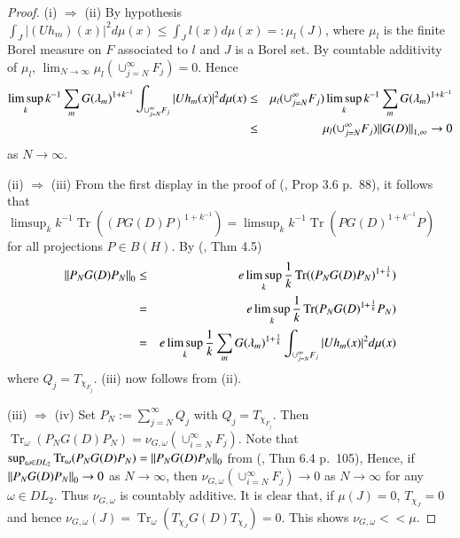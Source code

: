 \documentclass[final,1p]{elsarticle}
\numberwithin{equation}{section}
\theoremstyle{plain}
\theoremstyle{definition}
\begin{document}
\begin{proof}
(i) $\Rightarrow$ (ii) By hypothesis $\int_{J} |(Uh_m)(x)|^2 d\mu(x)
\leq \int_{J} l(x) d\mu(x) =: \mu_l(J)$, where $\mu_l$ is the finite Borel measure on $F$ associated to $l$ and $J$ is a Borel set.  By countable additivity of $\mu_l$,
$\lim_{N \to \infty} \mu_l(\cup_{j=N}^\infty F_j)
= 0$.  Hence
\begin{eqnarray*}
\limsup_k k^{-1} \sum_{m} G(\lambda_m)^{1+ k^{-1}} \int_{ \cup_{j=N}^\infty F_j} |Uh_m(x)|^2 d\mu(x)
& \leq & \mu_l(\cup_{j=N}^\infty F_j) \limsup_k k^{-1} \sum_{m} G(\lambda_m)^{1+ k^{-1}} \\
& \leq & \mu_l(\cup_{j=N}^\infty F_j) {\mbox{\ensuremath{\| {G(D)} \|}}}_{1,\infty} \to 0
\end{eqnarray*}
as $N \to \infty$.

(ii) $\Rightarrow$ (iii) From the first display in the proof of (\cite{CPS}, Prop 3.6 p.~88), it follows that $\limsup_k k^{-1}\operatorname{Tr}((PG(D)P)^{1+k^{-1}})
= \limsup_k k^{-1}\operatorname{Tr}(PG(D)^{1+k^{-1}}P)$ for all projections
$P \in B(H)$. By (\cite{CRSS}, Thm 4.5)
\begin{eqnarray*}
{\mbox{\ensuremath{\| {P_NG(D)P_N} \|}}}_0 & \leq & e \limsup_k \frac 1k
\operatorname{Tr}((P_NG(D)P_N)^{1+ \frac 1k}) \\
& = & e \limsup_k \frac 1k
\operatorname{Tr}(P_NG(D)^{1+ \frac 1k}P_N) \\
& = & e \limsup_k \frac 1k \sum_{m} G(\lambda_m)^{1+ \frac 1k} \int_{ \cup_{j=N}^\infty F_j} |Uh_m(x)|^2 d\mu(x)
\end{eqnarray*}
where $Q_j = T_{\chi_{F_j}}$. (iii) now follows from (ii).

(iii) $\Rightarrow$ (iv) Set $P_N := \sum_{j=N}^\infty Q_j$ with $Q_j = T_{\chi_{F_j}}$.
Then $\operatorname{Tr}_{\omega}(P_NG(D)P_N) = \nu_{G,\omega}(\cup_{i=N}^\infty F_j)$.
Note that $\sup_{\omega \in DL_2} \operatorname{Tr}_{\omega}(P_NG(D)P_N) = {\mbox{\ensuremath{\| {P_NG(D)P_N} \|}}}_0$ from (\cite{LSS}, Thm 6.4 p.~105), 
Hence, if ${\mbox{\ensuremath{\| {P_NG(D)P_N} \|}}}_0 \to 0$ as $N \to \infty$, then $\nu_{G,\omega}(\cup_{i=N}^\infty F_j) \to 0$ as $N \to \infty$
for any $\omega \in DL_2$.  Thus $\nu_{G,\omega}$ is countably additive.
It is clear that, if $\mu(J) = 0$, $T_{\chi_{J}} = 0$ and hence 
$\nu_{G,\omega}(J)= \operatorname{Tr}_{\omega}(T_{\chi_{J}}G(D)T_{\chi_{J}}) = 0$.
This shows $\nu_{G,\omega} {\ensuremath{\! < \! \! < \!}} \mu$.
\end{proof}
\end{document}
